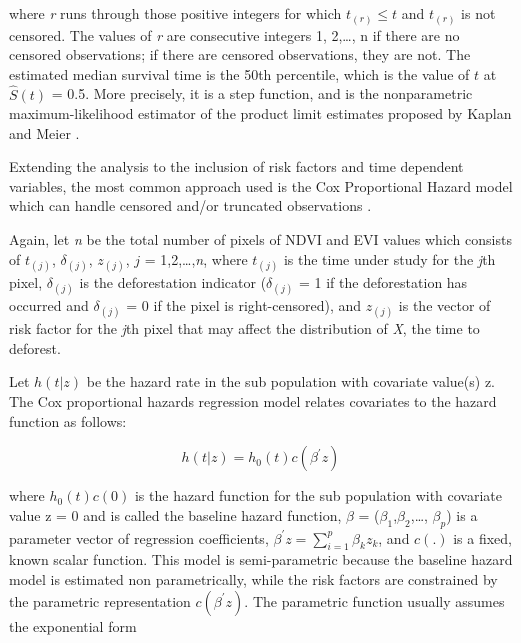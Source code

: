 where \textit{r} runs through those positive integers for which $t_{(r)} \leq t$ and $t_{(r)}$ is not censored. The values of \textit{r} are consecutive integers 1, 2,\dots , n if there are no censored observations; if there are censored observations, they are not. The estimated median survival time is the 50th percentile, which is the value of $t$ at $\hat{S}(t)$ = 0.5. More precisely, it is a step function, and is the nonparametric maximum-likelihood estimator of the product limit estimates proposed by Kaplan and Meier \citep{lee_wang_2003}.



Extending the analysis to the inclusion of risk factors and time dependent variables, the most common approach used is the Cox Proportional Hazard model which can handle censored and/or truncated observations \citep{Cox1972,cao_2005}. 

Again, let \textit{n} be the total number of pixels of NDVI and EVI values which consists of $t_{(j)}$, $\delta_{(j)}$, $z_{(j)}$, $\textit{j}$ = 1,2,\dots,\textit{n}, where $t_{(j)}$ is
the time under study for the \textit{j}th pixel, $\delta_{(j)}$ is the deforestation indicator ($\delta_{(j)}$ = 1 if the deforestation has occurred and $\delta_{(j)}$ = 0 if the pixel is right-censored), and $z_{(j)}$ is the vector of risk factor for the \textit{j}th pixel that may affect the distribution of \textit{X}, the time to deforest.

Let $h(t|z)$ be the hazard rate in the sub population with covariate value(s) z. The Cox proportional hazards regression model relates covariates to the hazard function as follows:

\begin{center}
\begin{equation}
h(t|z) = h_{0}(t)c(\beta^{'}z) \label{eq:4} 
\end{equation}
\end{center}

where $h_{0}(t)c(0)$ is the hazard function for the sub population with covariate value z = 0 and is called the baseline hazard function, $\beta$ = ($\beta_{1}$,$\beta_{2}$,\dots, $\beta_{p}$) is a parameter vector of regression coefficients, $\beta^{'}z = \sum^{p}_{i=1}\beta_{k}z_{k}$, and $c(.)$ is a fixed, known scalar function. This model is semi-parametric because the baseline hazard model is estimated non parametrically, while the risk factors are constrained by the parametric representation $c(\beta^{'}z)$. The parametric function usually assumes the exponential form 


